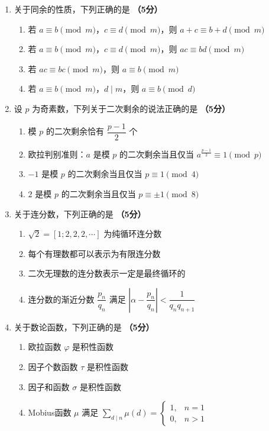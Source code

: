 \documentclass[12pt, a4paper]{ctexart}
\newcommand{\score}[1]{\hfill\textbf{（#1分）}}
\begin{document}
\vspace{8pt}

\begin{enumerate}[resume]

\item 关于同余的性质，下列正确的是 \score{5}
\begin{enumerate}[label=\Alph*.]
    \item 若 $a\equiv b\pmod{m}$，$c\equiv d\pmod{m}$，则 $a+c\equiv b+d\pmod{m}$
    \item 若 $a\equiv b\pmod{m}$，$c\equiv d\pmod{m}$，则 $ac\equiv bd\pmod{m}$
    \item 若 $ac\equiv bc\pmod{m}$，则 $a\equiv b\pmod{m}$
    \item 若 $a\equiv b\pmod{m}$，$d\mid m$，则 $a\equiv b\pmod{d}$
\end{enumerate}

\item 设 $p$ 为奇素数，下列关于二次剩余的说法正确的是 \score{5}
\begin{enumerate}[label=\Alph*.]
    \item 模 $p$ 的二次剩余恰有 $\dfrac{p-1}{2}$ 个
    \item 欧拉判别准则：$a$ 是模 $p$ 的二次剩余当且仅当 $a^{\frac{p-1}{2}}\equiv 1\pmod{p}$
    \item $-1$ 是模 $p$ 的二次剩余当且仅当 $p\equiv 1\pmod{4}$
    \item $2$ 是模 $p$ 的二次剩余当且仅当 $p\equiv \pm 1\pmod{8}$
\end{enumerate}

\item 关于连分数，下列正确的是 \score{5}
\begin{enumerate}[label=\Alph*.]
    \item $\sqrt{2}=[1;2,2,2,\cdots]$ 为纯循环连分数
    \item 每个有理数都可以表示为有限连分数
    \item 二次无理数的连分数表示一定是最终循环的
    \item 连分数的渐近分数 $\dfrac{p_n}{q_n}$ 满足 $\left|\alpha-\dfrac{p_n}{q_n}\right|<\dfrac{1}{q_nq_{n+1}}$
\end{enumerate}

\item 关于数论函数，下列正确的是 \score{5}
\begin{enumerate}[label=\Alph*.]
    \item 欧拉函数 $\varphi$ 是积性函数
    \item 因子个数函数 $\tau$ 是积性函数
    \item 因子和函数 $\sigma$ 是积性函数
    \item Mobius函数 $\mu$ 满足 $\displaystyle\sum_{d\mid n}\mu(d)=\begin{cases}1,&n=1\\0,&n>1\end{cases}$
\end{enumerate}

\end{enumerate}
\end{document}
